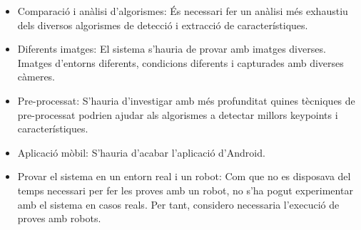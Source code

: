	\begin{itemize}
		\item{Comparació i anàlisi d'algorismes: És necessari fer un anàlisi més exhaustiu dels diversos algorismes de detecció i extracció de característiques.}
		\item{Diferents imatges: El sistema s'hauria de provar amb imatges diverses. Imatges d'entorns diferents, condicions diferents i capturades amb diverses càmeres.}
		\item{Pre-processat: S'hauria d'investigar amb més profunditat quines tècniques de pre-processat podrien ajudar als algorismes a detectar millors keypoints i característiques.}
		\item{Aplicació mòbil: S'hauria d'acabar l'aplicació d'Android.}
		\item{Provar el sistema en un entorn real i un robot: Com que no es disposava del temps necessari per fer les proves amb un robot, no s'ha pogut experimentar amb el sistema en casos reals. Per tant,
		considero necessaria l'execució de proves amb robots.}
	\end{itemize}
